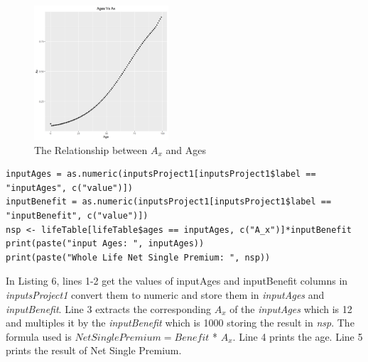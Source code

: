 \documentclass[12pt]{article}
\def\StartLineAtOne{\lstset{firstnumber=1}}
\begin{document}
\begin{figure}[h]
	
	\centering
	\includegraphics[width=0.5\linewidth, height=5cm]{S1.png}
	
	
	\caption{The Relationship between $A_{x}$ and Ages }
	
\end{figure}

\StartLineAtOne
\begin{lstlisting}[caption={ Life Net Single Premium},captionpos=b]
inputAges = as.numeric(inputsProject1[inputsProject1$label == "inputAges", c("value")])
inputBenefit = as.numeric(inputsProject1[inputsProject1$label == "inputBenefit", c("value")])
nsp <- lifeTable[lifeTable$ages == inputAges, c("A_x")]*inputBenefit
print(paste("input Ages: ", inputAges))
print(paste("Whole Life Net Single Premium: ", nsp))
\end{lstlisting}
In Listing 6, lines 1-2 get the values of inputAges and inputBenefit columns in \textit{inputsProject1} convert them to numeric and store them in \textit{inputAges} and \textit{inputBenefit}. Line 3 extracts the corresponding $A_{x}$ of the \textit{inputAges} which is 12 and multiples it by the \textit{inputBenefit} which is 1000 storing the result in \textit{nsp}. The formula used is $Net Single Premium = Benefit$ * $A_{x}$. Line 4 prints the age. Line 5 prints the result of Net Single Premium.
\pagebreak
\end{document}
